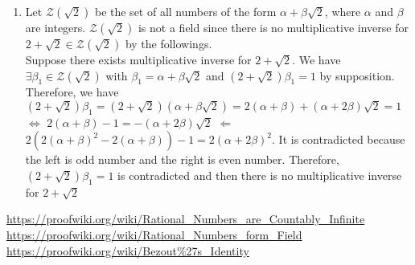 \documentclass{article}
\newcommand\Z{\mathcal Z}
\newcommand\Q{\mathcal Q}
\begin{document}
\begin{enumerate}[label = (\alph*)]
\begin{enumerate}[label=\arabic*)]
($\Q(\sqrt2)$ has multiplicative identity)
\item For all $\alpha_1 \in \Q(\sqrt2)$ with $\alpha_1 \ne 0$, put $\alpha_1 = a + b\sqrt2$ with $a,b \in \Q$. In this case, $a \ne 0$ or $b \ne 0$ holds by the followings.\\
``If $\alpha_1 = 0$, we have $\alpha_1 = a + b\sqrt2 = 0 \Leftrightarrow a = -b\sqrt2$. 
Therefore, $a = b = 0$ by $a,b \in \Q$.''\\
Let $\alpha''_1 = \dfrac{a}{a^2 - 2b^2} + \left(-\dfrac{b}{a^2 - 2b^2}\right)\sqrt2 \in \Q(\sqrt2)$. Note that we have $a^2 -2b^2 = (a + b\sqrt2)(a - b\sqrt2)$ and $a,b \in \Q$ with ($a \ne 0$ or $b \ne 0$), so we have $a + b\sqrt2 \ne 0$ and $a - b\sqrt2 \ne 0$, and then $a^2 -2b^2 \in \Q$ with $a^2 -2b^2 \ne 0$.
We have $\alpha_1\alpha''_1 = (a + b\sqrt2)\left(\dfrac{a}{a^2 - 2b^2} + \left(-\dfrac{b}{a^2 - 2b^2}\right)\sqrt2\right) = \dfrac{a^2 - ab\sqrt2 + ab\sqrt2 - 2b^2 }{a^2 - 2b^2} = 1$. 
Therefore, to every $\alpha_1 \in \Q(\sqrt2)$ with $\alpha_1 \ne 0$, there exists $\alpha''_1 \in \Q(\sqrt2)$ with $\alpha_1\alpha''_1 = 1$
\item $\alpha_1(\alpha_2 + \alpha_3) = \alpha_1\alpha_2 + \alpha_1\alpha_3$ (distributive law stands)
\end{enumerate}
from 1) to )9, $\Q(\sqrt2)$ is a field.
\item
Let $\Z(\sqrt2)$ be the set of all numbers of the form $\alpha + \beta\sqrt2$, where $\alpha$ and $\beta$ are integers. 
$\Z(\sqrt2)$ is not a field since there is no multiplicative inverse for $2 + \sqrt2 \in \Z(\sqrt2)$ by the followings.\\
Suppose there exists multiplicative inverse for $2 + \sqrt2$.
We have $\exists\beta_1 \in \Z(\sqrt2)$ with $\beta_1 = \alpha + \beta\sqrt2$ and $(2 + \sqrt2)\beta_1 = 1$ by supposition.
Therefore, we have $(2 + \sqrt2)\beta_1 = (2 + \sqrt2)(\alpha + \beta\sqrt2) = 2(\alpha + \beta) + (\alpha + 2\beta)\sqrt2 = 1$ $\Leftrightarrow$ $2(\alpha + \beta) - 1 = -(\alpha + 2\beta)\sqrt2$ $\Leftarrow$ $2(2(\alpha + \beta)^2 - 2(\alpha + \beta)) - 1 = 2(\alpha + 2\beta)^2$.
It is contradicted because the left is odd number and the right is even number.
Therefore, $(2 + \sqrt2)\beta_1 = 1$ is contradicted and then there is no multiplicative inverse for $2 + \sqrt2$ 

\end{enumerate}

\begin{thebibliography}{9}
 \url{https://proofwiki.org/wiki/Rational_Numbers_are_Countably_Infinite}
 \url{https://proofwiki.org/wiki/Rational_Numbers_form_Field}
 \url{https://proofwiki.org/wiki/Bezout\%27s_Identity}
\end{thebibliography}
\end{document}

